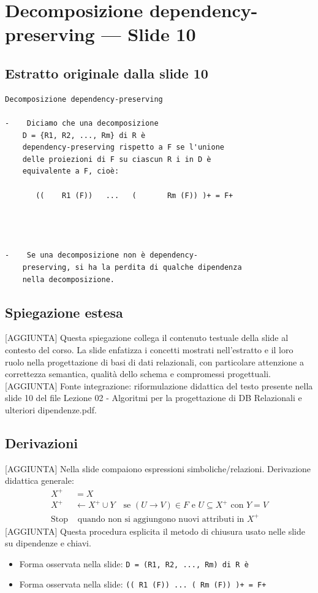 \documentclass[11pt]{article}
\begin{document}
\section{Decomposizione dependency-preserving --- Slide 10}
\subsection*{Estratto originale dalla slide 10}
\begin{lstlisting}
Decomposizione dependency-preserving

-    Diciamo che una decomposizione
    D = {R1, R2, ..., Rm} di R è
    dependency-preserving rispetto a F se l'unione
    delle proiezioni di F su ciascun R i in D è
    equivalente a F, cioè:

       ((    R1 (F))   ...   (       Rm (F)) )+ = F+




-    Se una decomposizione non è dependency-
    preserving, si ha la perdita di qualche dipendenza
    nella decomposizione.
\end{lstlisting}
\subsection*{Spiegazione estesa}
[AGGIUNTA] Questa spiegazione collega il contenuto testuale della slide al contesto del corso. La slide enfatizza i concetti mostrati nell'estratto e il loro ruolo nella progettazione di basi di dati relazionali, con particolare attenzione a correttezza semantica, qualità dello schema e compromessi progettuali.
[AGGIUNTA] Fonte integrazione: riformulazione didattica del testo presente nella slide 10 del file Lezione 02 - Algoritmi per la progettazione di DB Relazionali e ulteriori dipendenze.pdf.
\subsection*{Derivazioni}
[AGGIUNTA] Nella slide compaiono espressioni simboliche/relazioni. Derivazione didattica generale:
\begin{align*}
X^+ &= X \\
X^+ &\leftarrow X^+ \cup Y \quad \text{se } (U \to V) \in F \text{ e } U \subseteq X^+ \text{ con } Y=V \\
\text{Stop} &\text{ quando non si aggiungono nuovi attributi in } X^+
\end{align*}
[AGGIUNTA] Questa procedura esplicita il metodo di chiusura usato nelle slide su dipendenze e chiavi.
\begin{itemize}[leftmargin=*]
\item Forma osservata nella slide: \texttt{D = (R1, R2, ..., Rm) di R è}
\item Forma osservata nella slide: \texttt{((    R1 (F))   ...   (       Rm (F)) )+ = F+}
\end{itemize}
\end{document}
